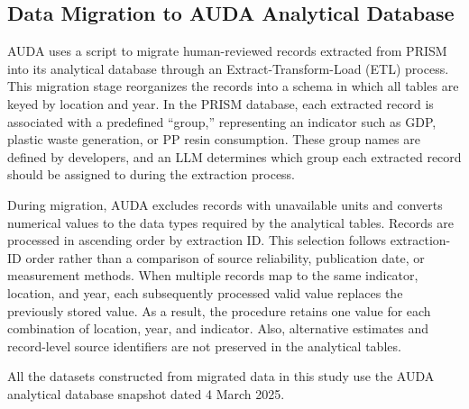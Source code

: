 \subsection{Data Migration to AUDA Analytical Database}

AUDA uses a script to migrate human-reviewed records extracted from PRISM into its analytical database through an Extract-Transform-Load (ETL) process.
This migration stage reorganizes the records into a schema in which all tables are keyed by location and year.
In the PRISM database, each extracted record is associated with a predefined ``group,'' representing an indicator such as GDP, plastic waste generation, or PP resin consumption.
These group names are defined by developers, and an LLM determines which group each extracted record should be assigned to during the extraction process.

During migration, AUDA excludes records with unavailable units and converts numerical values to the data types required by the analytical tables.
Records are processed in ascending order by extraction ID.
This selection follows extraction-ID order rather than a comparison of source reliability, publication date, or measurement methods.
When multiple records map to the same indicator, location, and year, each subsequently processed valid value replaces the previously stored value.
As a result, the procedure retains one value for each combination of location, year, and indicator.
Also, alternative estimates and record-level source identifiers are not preserved in the analytical tables.

All the datasets constructed from migrated data in this study use the AUDA analytical database snapshot dated 4 March 2025.

